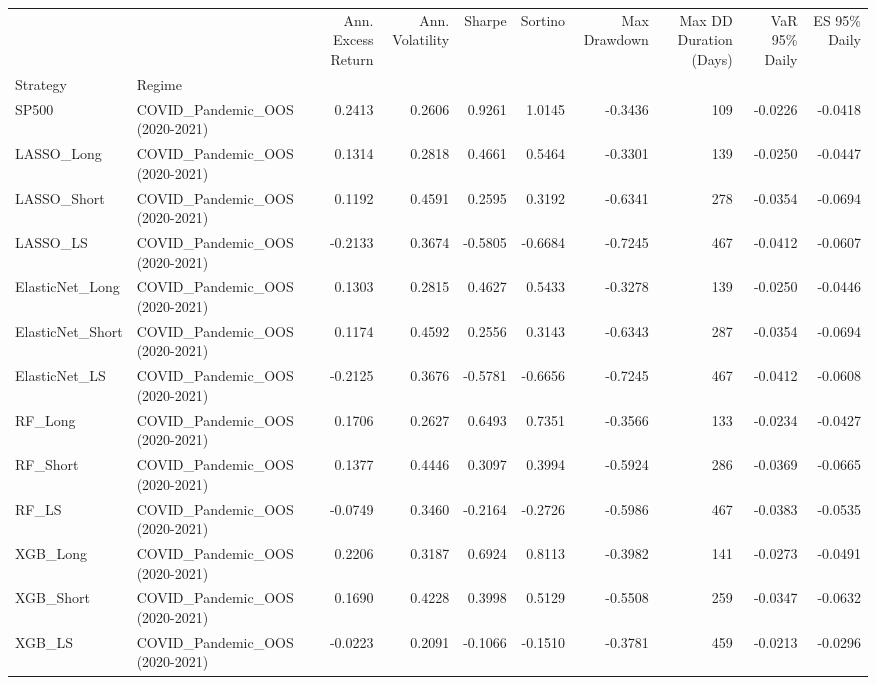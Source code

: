 \begin{tabular}{llrrrrrrrr}
\toprule
 &  & Ann. Excess Return & Ann. Volatility & Sharpe & Sortino & Max Drawdown & Max DD Duration (Days) & VaR 95\% Daily & ES 95\% Daily \\
Strategy & Regime &  &  &  &  &  &  &  &  \\
\midrule
SP500 & COVID\_Pandemic\_OOS (2020-2021) & 0.2413 & 0.2606 & 0.9261 & 1.0145 & -0.3436 & 109 & -0.0226 & -0.0418 \\
\cline{1-10}
LASSO\_Long & COVID\_Pandemic\_OOS (2020-2021) & 0.1314 & 0.2818 & 0.4661 & 0.5464 & -0.3301 & 139 & -0.0250 & -0.0447 \\
\cline{1-10}
LASSO\_Short & COVID\_Pandemic\_OOS (2020-2021) & 0.1192 & 0.4591 & 0.2595 & 0.3192 & -0.6341 & 278 & -0.0354 & -0.0694 \\
\cline{1-10}
LASSO\_LS & COVID\_Pandemic\_OOS (2020-2021) & -0.2133 & 0.3674 & -0.5805 & -0.6684 & -0.7245 & 467 & -0.0412 & -0.0607 \\
\cline{1-10}
ElasticNet\_Long & COVID\_Pandemic\_OOS (2020-2021) & 0.1303 & 0.2815 & 0.4627 & 0.5433 & -0.3278 & 139 & -0.0250 & -0.0446 \\
\cline{1-10}
ElasticNet\_Short & COVID\_Pandemic\_OOS (2020-2021) & 0.1174 & 0.4592 & 0.2556 & 0.3143 & -0.6343 & 287 & -0.0354 & -0.0694 \\
\cline{1-10}
ElasticNet\_LS & COVID\_Pandemic\_OOS (2020-2021) & -0.2125 & 0.3676 & -0.5781 & -0.6656 & -0.7245 & 467 & -0.0412 & -0.0608 \\
\cline{1-10}
RF\_Long & COVID\_Pandemic\_OOS (2020-2021) & 0.1706 & 0.2627 & 0.6493 & 0.7351 & -0.3566 & 133 & -0.0234 & -0.0427 \\
\cline{1-10}
RF\_Short & COVID\_Pandemic\_OOS (2020-2021) & 0.1377 & 0.4446 & 0.3097 & 0.3994 & -0.5924 & 286 & -0.0369 & -0.0665 \\
\cline{1-10}
RF\_LS & COVID\_Pandemic\_OOS (2020-2021) & -0.0749 & 0.3460 & -0.2164 & -0.2726 & -0.5986 & 467 & -0.0383 & -0.0535 \\
\cline{1-10}
XGB\_Long & COVID\_Pandemic\_OOS (2020-2021) & 0.2206 & 0.3187 & 0.6924 & 0.8113 & -0.3982 & 141 & -0.0273 & -0.0491 \\
\cline{1-10}
XGB\_Short & COVID\_Pandemic\_OOS (2020-2021) & 0.1690 & 0.4228 & 0.3998 & 0.5129 & -0.5508 & 259 & -0.0347 & -0.0632 \\
\cline{1-10}
XGB\_LS & COVID\_Pandemic\_OOS (2020-2021) & -0.0223 & 0.2091 & -0.1066 & -0.1510 & -0.3781 & 459 & -0.0213 & -0.0296 \\

\end{tabular}
